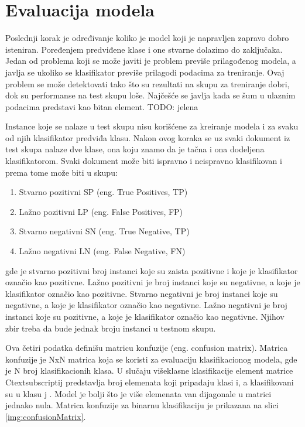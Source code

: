 \documentclass[12pt,oneside]{memoir}
\begin{document}
\section{Evaluacija modela}

Poslednji korak je određivanje koliko je model koji je napravljen zapravo dobro isteniran. Poređenjem predviđene klase i one stvarne dolazimo do zaključaka. Jedan od problema koji se može javiti je problem previše prilagođenog modela, a javlja se ukoliko se klasifikator previše prilagodi podacima za treniranje. Ovaj problem se može detektovati tako što su rezultati na skupu za treniranje dobri, dok su performanse na test skupu loše. Najčešće se javlja kada se šum u ulaznim podacima predstavi kao bitan element.  TODO: jelena

Instance koje se nalaze u test skupu nisu korišćene za kreiranje modela i za svaku od njih klasifikator predviđa klasu. Nakon ovog koraka se uz svaki dokument iz test skupa nalaze dve klase, ona koju znamo da je tačna i ona dodeljena klasifikatorom. Svaki dokument može biti ispravno i neispravno klasifikovan i prema tome može biti u skupu:

\begin{enumerate}
\item Stvarno pozitivni SP (eng. True Positives, TP)
\item Lažno pozitivni LP (eng. False Positives, FP)
\item Stvarno negativni SN (eng. True Negative, TP)
\item Lažno negativni LN (eng. False Negative, FN)
\end{enumerate}

gde je stvarno pozitivni broj instanci koje su zaista pozitivne i koje je klasifikator označio kao pozitivne. Lažno pozitivni je broj instanci koje su negativne, a koje je klasifikator označio kao pozitivne. Stvarno negativni je broj instanci koje su negativne, a koje je klasifikator označio kao negativne. Lažno negativni je broj instanci koje su pozitivne, a koje je klasifikator označio kao negativne. Njihov zbir treba da bude jednak broju instanci u testnom skupu.

Ova četiri podatka definišu matricu konfuzije (eng. confusion matrix). Matrica konfuzije je NxN matrica koja se koristi za evaluaciju klasifikacionog modela, gde je N broj klasifikacionih klasa. U slučaju višeklasne klasifikacije element matrice Ctextsubscript{ij} predstavlja broj elemenata koji pripadaju klasi i, a klasifikovani su u klasu j \cite{MarijaMR}. Model je bolji što je više elemenata van dijagonale u matrici jednako nula. Matrica konfuzije za binarnu klasifikaciju je prikazana na slici \ref{img:confusionMatrix}.
\end{document}
